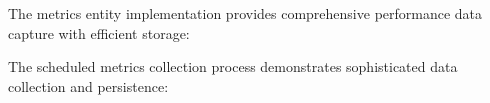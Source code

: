 
The metrics entity implementation provides comprehensive performance data capture with efficient storage:



The scheduled metrics collection process demonstrates sophisticated data collection and persistence:


